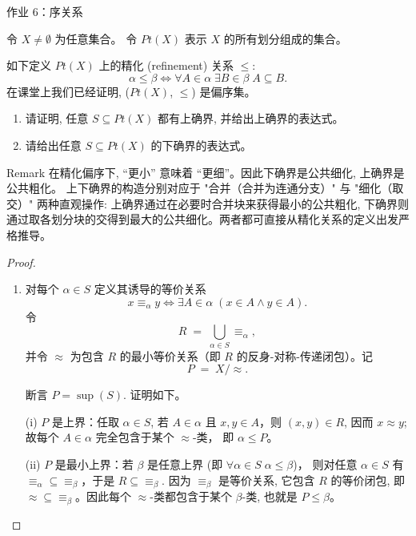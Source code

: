 
\begin{frame}[allowframebreaks]{作业 6：序关系}

\begin{problem}[集合划分与精化关系]
  令 $X \neq \emptyset$ 为任意集合。
  令 $Pt(X)$ 表示 $X$ 的所有划分组成的集合。

  如下定义 $Pt(X)$ 上的精化 (refinement) 关系 $\le$:
  \[
    \alpha \le \beta \iff
      \forall A \in \alpha\; \exists B \in \beta\; A \subseteq B.
  \]
  在课堂上我们已经证明, ($Pt(X)$, $\le$) 是偏序集。


  \begin{enumerate}[(1)]
    \item 请证明, 任意 $S \subseteq Pt(X)$ 都有上确界, 并给出上确界的表达式。
    \item 请给出任意 $S \subseteq Pt(X)$ 的下确界的表达式。
  \end{enumerate}
\end{problem}

\begin{block}{Remark}
  在精化偏序下, ``更小'' 意味着 ``更细''。因此下确界是公共细化, 上确界是公共粗化。
  上下确界的构造分别对应于 "合并（合并为连通分支）" 与 "细化（取交）" 两种直观操作: 上确界通过在必要时合并块来获得最小的公共粗化,
  下确界则通过取各划分块的交得到最大的公共细化。两者都可直接从精化关系的定义出发严格推导。
\end{block}

\begin{proof}
  \begin{enumerate}[(1)]
    \item[上确界]
      对每个 $\alpha\in S$ 定义其诱导的等价关系
      \[x\equiv_{\alpha} y \iff \exists A\in\alpha\; (x\in A\land y\in A).\]
      令
      \[R\;=\;\bigcup_{\alpha\in S} \equiv_{\alpha},\]
      并令 $\approx$ 为包含 $R$ 的最小等价关系（即 $R$ 的反身-对称-传递闭包）。记
      \[P\;=\;X/\approx.\]

      断言 $P=\sup(S)$. 证明如下。

      (i) $P$ 是上界：任取 $\alpha\in S$, 若 $A\in\alpha$ 且 $x,y\in A$，则 $(x,y)\in R$, 因而 $x\approx y$;
      故每个 $A\in\alpha$ 完全包含于某个 $\approx$-类， 即 $\alpha\le P$。

      (ii) $P$ 是最小上界：若 $\beta$ 是任意上界 (即 $\forall\alpha\in S\;\alpha\le\beta$)，
      则对任意 $\alpha\in S$ 有 $\equiv_{\alpha}\subseteq\equiv_{\beta}$，于是
      $R\subseteq\equiv_{\beta}$. 因为 $\equiv_{\beta}$ 是等价关系, 它包含 $R$ 的等价闭包, 即
      $\approx\subseteq\equiv_{\beta}$。因此每个 $\approx$-类都包含于某个 $\beta$-类, 也就是 $P\le\beta$。


\end{enumerate}
\end{proof}
\end{frame}
